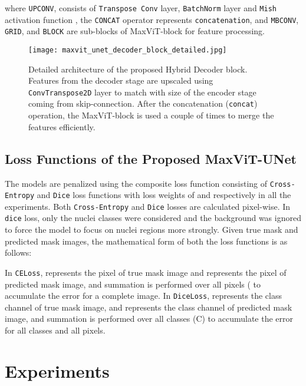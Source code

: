 \documentclass{article}
\begin{document}
where \texttt{UPCONV}, consists of \texttt{Transpose Conv} layer, \texttt{BatchNorm} layer \cite{ioffe2015batch} and \texttt{Mish} activation function \cite{misra2019mish}, the \texttt{CONCAT} operator represents \texttt{concatenation}, and \texttt{MBCONV}, \texttt{GRID}, and \texttt{BLOCK} are sub-blocks of MaxViT-block for feature processing.

\begin{figure}[ht!]
  \centering
  \texttt{[image: maxvit\_unet\_decoder\_block\_detailed.jpg]}
  \caption{Detailed architecture of the proposed Hybrid Decoder block. Features from the   decoder stage are upscaled using \texttt{ConvTranspose2D} layer to match with size of the  encoder stage coming from skip-connection. After the concatenation (\texttt{concat}) operation, the MaxViT-block is used a couple of times to merge the features efficiently.}
  \label{fig:maxvit-unet-decoder-block}
\end{figure}

\subsection{Loss Functions of the Proposed MaxViT-UNet}\label{Loss Functions of the Proposed MaxViT-UNet}

The models are penalized using the composite loss function consisting of \texttt{Cross-Entropy} and \texttt{Dice} loss functions with loss weights of  and  respectively in all the experiments. Both \texttt{Cross-Entropy} and \texttt{Dice} losses are calculated pixel-wise. In \texttt{dice} loss, only the nuclei classes were considered and the background was ignored to force the model to focus on nuclei regions more strongly. Given true mask  and predicted mask  images, the mathematical form of both the loss functions is as follows:


In \texttt{CELoss},  represents the  pixel of true mask image and  represents the  pixel of predicted mask image, and summation is performed over all pixels ( to accumulate the error for a complete image. In \texttt{DiceLoss},  represents the  class channel of true mask image, and  represents the  class channel of predicted mask image, and summation is performed over all classes (C) to accumulate the error for all classes and all pixels.

\section{Experiments}\label{Experiments}
\end{document}
